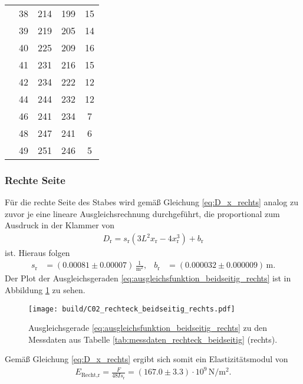 \begin{table}[H]
\begin{tabular}[]{S S[table-format = 2.0] S S S[table-format = 2.0]}
                 & 38 & 214 & 199 & 15 \\
                 & 39 & 219 & 205 & 14 \\
                 & 40 & 225 & 209 & 16 \\
                 & 41 & 231 & 216 & 15 \\
                 & 42 & 234 & 222 & 12 \\
                 & 44 & 244 & 232 & 12 \\
                 & 46 & 241 & 234 &  7 \\
                 & 48 & 247 & 241 &  6 \\
                 & 49 & 251 & 246 &  5 \\
        \bottomrule
    \end{tabular}
\end{table}

\subsubsection{Rechte Seite}
Für die rechte Seite des Stabes wird gemäß Gleichung \eqref{eq:D_x_rechts} analog zu zuvor je eine lineare Ausgleichsrechnung durchgeführt,
die proportional zum Ausdruck in der Klammer von
\begin{align}
    D_\text{r} = s_\text{r} \left(3 L^2 x_\text{r} - 4 x_\text{r}^3\right) + b_\text{r}
    \label{eq:ausgleichsfunktion_beidseitig_rechts}
\end{align}
ist.
Hieraus folgen 
\begin{align*}
    s_\text{r} &= (\num{0.00081} \pm \num{0.00007}) \, \frac{1}{\unit{\meter^2}}, & 
    b_\text{r} &= (\num{0.000032} \pm \num{0.000009}) \, \unit{\meter}.
\end{align*}
Der Plot der Ausgleichsgeraden \eqref{eq:ausgleichsfunktion_beidseitig_rechts} ist in Abbildung \ref{fig:plot_rechteck_beidseitig_rechts}
zu sehen.
%
\begin{figure}[H]
    \centering
    \texttt{[image: build/C02\_rechteck\_beidseitig\_rechts.pdf]}
    \caption{Ausgleichsgerade \eqref{eq:ausgleichsfunktion_beidseitig_rechts} zu den Messdaten aus Tabelle \ref{tab:messdaten_rechteck_beidseitig} (rechts).}
    \label{fig:plot_rechteck_beidseitig_rechts}
\end{figure}

\noindent
Gemäß Gleichung \eqref{eq:D_x_rechts} ergibt sich somit ein Elastizitätsmodul von 
\begin{align}
    E_\text{Recht,r} = \frac{F}{48 I s_\text{r}} = (\num{167.0} \pm \num{3.3}) \cdot 10^9 \, \unit{\newton\per\meter^2}.
\end{align}




